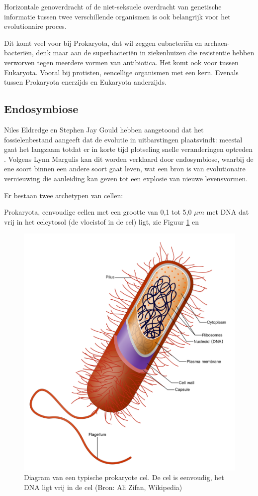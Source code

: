 \documentclass[
  11pt,
]{book}
\begin{document}
Horizontale genoverdracht of de niet-seksuele overdracht van genetische informatie tussen twee verschillende organismen is ook belangrijk voor het evolutionaire proces.

Dit komt veel voor bij Prokaryota, dat wil zeggen eubacteriën en archaea-bacteriën, denk maar aan de superbacteriën in ziekenhuizen die resistentie hebben verworven tegen meerdere vormen van antibiotica. Het komt ook voor tussen Eukaryota. Vooral bij protisten, eencellige organismen met een kern. Evenals tussen Prokaryota enerzijds en Eukaryota anderzijds.

\hypertarget{endosymbiose}{%
\subsection{Endosymbiose}\label{endosymbiose}}

Niles Eldredge en Stephen Jay Gould hebben aangetoond dat het fossielenbestand aangeeft dat de evolutie in uitbarstingen plaatsvindt: meestal gaat het langzaam totdat er in korte tijd plotseling snelle veranderingen optreden \citep{margulis1999}. Volgens Lynn Margulis kan dit worden verklaard door endosymbiose, waarbij de ene soort binnen een andere soort gaat leven, wat een bron is van evolutionaire vernieuwing die aanleiding kan geven tot een explosie van nieuwe levensvormen.

Er bestaan twee archetypen van cellen:

Prokaryota, eenvoudige cellen met een grootte van 0,1 tot 5,0 \(\mu m\) met DNA dat vrij in het celcytosol (de vloeistof in de cel) ligt, zie Figuur \ref{fig:prokaryotaCell} en

\begin{figure}

{\centering \includegraphics[width=0.5\linewidth]{./figs/prokaryoteCell} 

}

\caption{ Diagram van een typische prokaryote cel. De cel is eenvoudig, het DNA ligt vrij in de cel (Bron: Ali Zifan, Wikipedia)}\label{fig:prokaryotaCell}
\end{figure}
\end{document}
